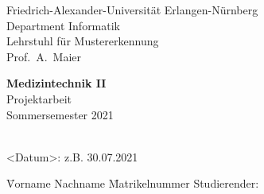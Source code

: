 

\begin{titlepage}

\begin{center}
Friedrich-Alexander-Universit\"at Erlangen-N\"urnberg\\
Department Informatik\\
Lehrstuhl f\"ur Mustererkennung\\
Prof.\ A.\ Maier\\

\vspace*{9em}

{\huge \textbf{\textsf{Medizintechnik II}}}\\[.3em]
{Projektarbeit}\\[.3em]
{Sommersemester 2021}\\

\vspace*{9em}

{\huge \textbf{\textsf{\titel}}}\\[.7em]
{<Datum>: z.B. 30.07.2021}
\end{center}

\vfill%
\begin{tabbing}
	\hspace*{5cm} \= Vorname Nachname \hspace*{4em} \= Matrikelnummer \kill
	Studierender:\> \erster \> \mnreins \\
\end{tabbing}

\end{titlepage}
